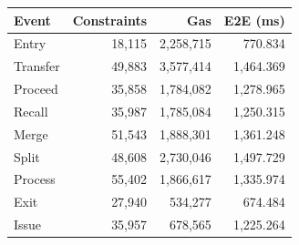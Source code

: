\begin{tabular}{@{}lrrr@{}}\toprule
        \textbf{Event} & \textbf{Constraints} & \textbf{Gas} & \textbf{E2E (ms)} \\
        \midrule
        Entry          & 18,115               & 2,258,715    & 770.834           \\
        Transfer       & 49,883               & 3,577,414    & 1,464.369         \\
        Proceed        & 35,858               & 1,784,082    & 1,278.965         \\
        Recall         & 35,987               & 1,785,084    & 1,250.315         \\
        Merge          & 51,543               & 1,888,301    & 1,361.248         \\
        Split          & 48,608               & 2,730,046    & 1,497.729         \\
        Process        & 55,402               & 1,866,617    & 1,335.974         \\
        Exit           & 27,940               & 534,277      & 674.484           \\
        Issue          & 35,957               & 678,565      & 1,225.264         \\
        \bottomrule\end{tabular}
